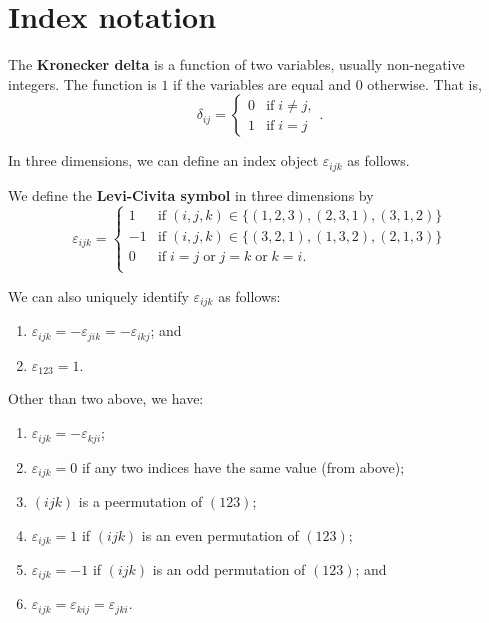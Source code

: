 \chapter{Index notation}

\begin{definition}
    The \textbf{Kronecker delta} is a function of two variables, usually non-negative integers. The function is $1$ if the variables are equal and $0$ otherwise. That is,
    \[ 
        \delta_{ij} =
        \begin{cases}
            0 & \text{if}\; i \neq j, \\
            1 & \text{if}\; i = j
        \end{cases}
        .
    \]
\end{definition}

In three dimensions, we can define an index object $\varepsilon_{ijk}$ as follows.

\begin{definition}
    We define the \textbf{Levi-Civita symbol} in three dimensions by
    \[
        \varepsilon_{ijk} =
        \begin{cases}
            1  & \text{if}\; (i,j,k) \in \{(1,2,3),(2,3,1),(3,1,2)\}        \\
            -1 & \text{if}\; (i,j,k) \in \{(3,2,1),(1,3,2),(2,1,3)\}        \\
            0  & \text{if}\; i = j \;\text{or}\; j = k \;\text{or}\; k = i. \\
        \end{cases}
    \]
\end{definition}

We can also uniquely identify $\varepsilon_{ijk}$ as follows:
\begin{enumerate}
    \item $\varepsilon_{ijk} = -\varepsilon_{jik} = -\varepsilon_{ikj}$; and
    \item $\varepsilon_{123} = 1$.
\end{enumerate}

\begin{proposition}
    Other than two above, we have:
    \begin{enumerate}
        \item $\varepsilon_{ijk} = -\varepsilon_{kji}$;
        \item $\varepsilon_{ijk} = 0$ if any two indices have the same value (from above);
        \item $(ijk)$ is a peermutation of $(123)$;
        \item $\varepsilon_{ijk} = 1$ if $(ijk)$ is an even permutation of $(123)$;
        \item $\varepsilon_{ijk} = -1$ if $(ijk)$ is an odd permutation of $(123)$; and
        \item $\varepsilon_{ijk} = \varepsilon_{kij} = \varepsilon_{jki}$.
    \end{enumerate}
\end{proposition}

